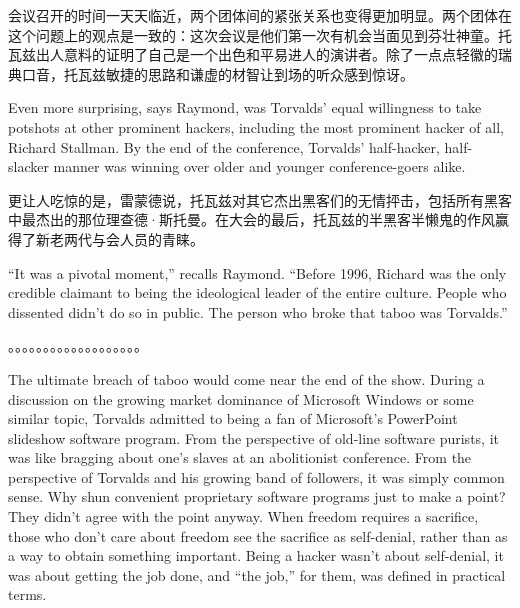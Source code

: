 \ifdefined\chs
会议召开的时间一天天临近，两个团体间的紧张关系也变得更加明显。两个团体在这个问题上的观点是一致的：这次会议是他们第一次有机会当面见到芬壮神童。托瓦兹出人意料的证明了自己是一个出色和平易进人的演讲者。除了一点点轻徽的瑞典口音，托瓦兹敏捷的思路和谦虚的材智让到场的听众感到惊讶。 
\fi

\ifdefined\eng
Even more surprising, says Raymond, was Torvalds' equal willingness to take potshots at other prominent hackers, including the most prominent hacker of all, Richard Stallman. By the end of the conference, Torvalds' half-hacker, half-slacker manner was winning over older and younger conference-goers alike.
\fi

\ifdefined\chs
更让人吃惊的是，雷蒙德说，托瓦兹对其它杰出黑客们的无情抨击，包括所有黑客中最杰出的那位理查德·斯托曼。在大会的最后，托瓦兹的半黑客半懒鬼的作风赢得了新老两代与会人员的青睐。
\fi

\ifdefined\eng
``It was a pivotal moment,'' recalls Raymond. ``Before 1996, Richard was the only credible claimant to being the ideological leader of the entire culture. People who dissented didn't do so in public. The person who broke that taboo was Torvalds.''
\fi

\ifdefined\chs
。。。。。。。。。。。。。。。。。。。
\fi

\ifdefined\eng
The ultimate breach of taboo would come near the end of the show. During a discussion on the growing market dominance of Microsoft Windows or some similar topic, Torvalds admitted to being a fan of Microsoft's PowerPoint slideshow software program. From the perspective of old-line software purists, it was like bragging about one's slaves at an abolitionist conference. From the perspective of Torvalds and his growing band of followers, it was simply common sense. Why shun convenient proprietary software programs just to make a point? They didn't agree with the point anyway. When freedom requires a sacrifice, those who don't care about freedom see the sacrifice as self-denial, rather than as a way to obtain something important.  Being a hacker wasn't about self-denial, it was about getting the job done, and ``the job,'' for them, was defined in practical terms.
\fi


